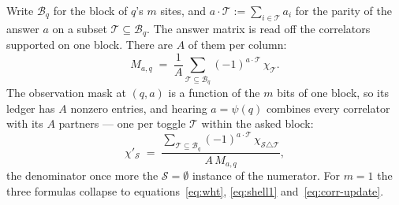 \documentclass[11pt]{article}
\begin{document}
Write $\mathcal B_q$ for the block of $q$'s $m$ sites, and
$a \cdot \mathcal T := \sum_{i \in \mathcal T} a_i$ for the parity of the answer $a$
on a subset $\mathcal T \subseteq \mathcal B_q$. The answer matrix is read off the
correlators supported on one block. There are $A$ of them per column:
\begin{equation}\label{eq:M-m}
  M_{a,q} \;=\; \frac{1}{A} \sum_{\mathcal T \subseteq \mathcal B_q}
  (-1)^{a \cdot \mathcal T}\, \chi_{\mathcal T}.
\end{equation}
The observation mask at $(q, a)$ is a function of the $m$ bits of
one block, so its ledger has $A$ nonzero entries, and hearing
$a = \psi(q)$ combines every correlator with its $A$ partners ---
one per toggle $\mathcal T$ within the asked block:
\begin{equation}\label{eq:corr-update-m}
  \chi'_{\mathcal S} \;=\; \frac{\sum_{\mathcal T \subseteq \mathcal B_q} (-1)^{a \cdot \mathcal T}\,
    \chi_{\mathcal S \triangle \mathcal T}}{A\, M_{a,q}},
\end{equation}
the denominator once more the $\mathcal S = \emptyset$ instance of the
numerator. For $m = 1$ the three
formulas collapse to
equations~\eqref{eq:wht}, \eqref{eq:shell1}
and~\eqref{eq:corr-update}.
\end{document}
